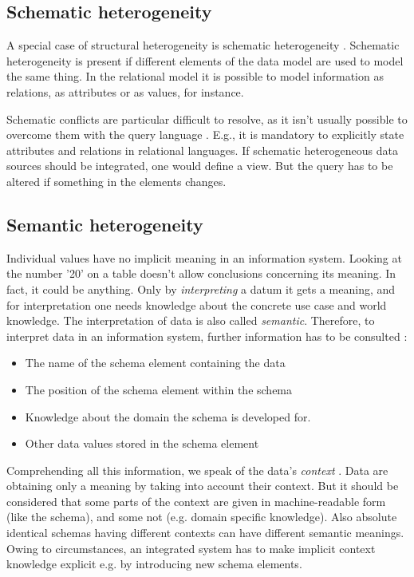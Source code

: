\subsection{Schematic  heterogeneity}
A special case of structural heterogeneity is schematic heterogeneity \cite[p. 67]{DBLP:books/dp/LeserN2006}. Schematic heterogeneity is present if different elements of the data model are used to model the same thing. In the relational model it is possible to model information as relations, as attributes or as values, for instance. 

Schematic conflicts are particular difficult to resolve, as it isn't usually possible to overcome them with the query language \cite[p. 68]{DBLP:books/dp/LeserN2006}. E.g., it is mandatory to explicitly state attributes and relations in relational languages. If schematic heterogeneous data sources should be integrated, one would define a view. But the query has to be altered if something in the elements changes.

\subsection{Semantic  heterogeneity}
Individual values have no implicit meaning in an information system. Looking at the number '20' on a table doesn't allow conclusions concerning its meaning. In fact, it could be anything. Only by \textit{interpreting} a datum it gets a meaning, and for interpretation one needs knowledge about the concrete use case and world knowledge. The interpretation of data is also called \textit{semantic}. Therefore, to interpret data in an information system, further information has to be consulted \cite[p. 73]{DBLP:books/dp/LeserN2006}:
\begin{itemize}
\item The name of the schema element containing the data
\item The position of the schema element within the schema
\item Knowledge about the domain the schema is developed for.
\item Other data values stored in the schema element
\end{itemize}
Comprehending all this information, we speak of the data's \textit{context} \cite[p. 74]{DBLP:books/dp/LeserN2006}. Data are obtaining only a meaning by taking into account their context. But it should be considered that some parts of the context are given in machine-readable form (like the schema), and some not (e.g. domain specific knowledge). Also absolute identical schemas having different contexts can have different semantic meanings. Owing to circumstances, an integrated system has to make implicit context knowledge explicit e.g. by introducing new schema elements.

